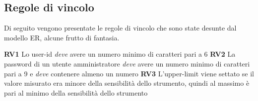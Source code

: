 \documentclass[12pt,a4paper,onecolumn]{article}
\begin{document}
	\subsection{Regole di vincolo}
		Di seguito vengono presentate le regole di vincolo che sono state desunte dal modello ER, alcune frutto di fantasia.
		
		\begin{flushleft}
			\textbf{RV1} Lo user-id \textit{deve} avere un numero minimo di caratteri pari a 6\newline
			\textbf{RV2} La password di un utente amministratore \textit{deve} avere un numero minimo di caratteri pari a 9 e \textit{deve} contenere almeno un numero\newline
			\textbf{RV3} L'upper-limit viene settato se il valore misurato era minore della sensibilità dello strumento, quindi al massimo è pari al minimo della sensibilità dello strumento
		\end{flushleft}

%			
		
\end{document}
